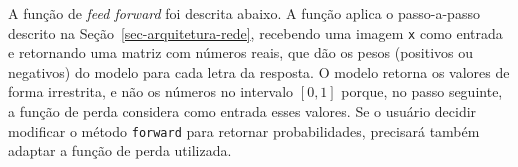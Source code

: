 \documentclass[12pt,twoside,brazilian]{book}
\newenvironment{Shaded}{\begin{snugshade}}{\end{snugshade}}
\newcommand{\AttributeTok}[1]{\textcolor[rgb]{0.40,0.45,0.13}{#1}}
\newcommand{\CommentTok}[1]{\textcolor[rgb]{0.37,0.37,0.37}{#1}}
\newcommand{\DecValTok}[1]{\textcolor[rgb]{0.68,0.00,0.00}{#1}}
\newcommand{\FunctionTok}[1]{\textcolor[rgb]{0.28,0.35,0.67}{#1}}
\newcommand{\NormalTok}[1]{\textcolor[rgb]{0.00,0.23,0.31}{#1}}
\newcommand{\OtherTok}[1]{\textcolor[rgb]{0.00,0.23,0.31}{#1}}
\newcommand{\SpecialCharTok}[1]{\textcolor[rgb]{0.37,0.37,0.37}{#1}}
\begin{document}
\begin{Shaded}
\end{Shaded}

A função de \emph{feed forward} foi descrita abaixo. A função aplica o
passo-a-passo descrito na Seção~\ref{sec-arquitetura-rede}, recebendo
uma imagem \texttt{x} como entrada e retornando uma matriz com números
reais, que dão os pesos (positivos ou negativos) do modelo para cada
letra da resposta. O modelo retorna os valores de forma irrestrita, e
não os números no intervalo \([0,1]\) porque, no passo seguinte, a
função de perda considera como entrada esses valores. Se o usuário
decidir modificar o método \texttt{forward} para retornar
probabilidades, precisará também adaptar a função de perda utilizada.
\end{document}
